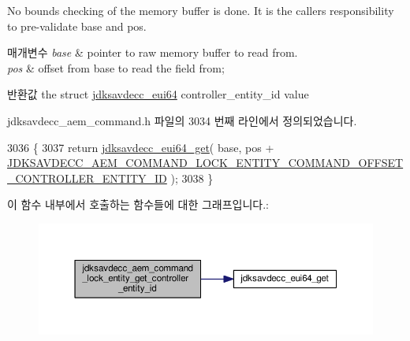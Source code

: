 No bounds checking of the memory buffer is done. It is the caller\textquotesingle{}s responsibility to pre-\/validate base and pos.


\begin{DoxyParams}{매개변수}
{\em base} & pointer to raw memory buffer to read from. \\
\hline
{\em pos} & offset from base to read the field from; \\
\hline
\end{DoxyParams}
\begin{DoxyReturn}{반환값}
the struct \hyperlink{structjdksavdecc__eui64}{jdksavdecc\+\_\+eui64} controller\+\_\+entity\+\_\+id value 
\end{DoxyReturn}


jdksavdecc\+\_\+aem\+\_\+command.\+h 파일의 3034 번째 라인에서 정의되었습니다.


\begin{DoxyCode}
3036 \{
3037     \textcolor{keywordflow}{return} \hyperlink{group__eui64_ga2652311a25a6b91cddbed75c108c7031}{jdksavdecc\_eui64\_get}( base, pos + 
      \hyperlink{group__command__lock__entity_ga314315c8a3f1f29414e04e030c7545e5}{JDKSAVDECC\_AEM\_COMMAND\_LOCK\_ENTITY\_COMMAND\_OFFSET\_CONTROLLER\_ENTITY\_ID}
       );
3038 \}
\end{DoxyCode}


이 함수 내부에서 호출하는 함수들에 대한 그래프입니다.\+:
\nopagebreak
\begin{figure}[H]
\begin{center}
\leavevmode
\includegraphics[width=350pt]{group__command__lock__entity_ga2945717e213e7601af926acb95c3230c_cgraph}
\end{center}
\end{figure}


